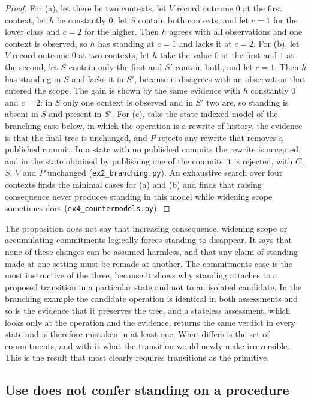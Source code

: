 \begin{proof}
For (a), let there be two contexts, let $V$ record outcome $0$ at the first context, let $h$ be constantly $0$, let $S$ contain both contexts, and let $c=1$ for the lower class and $c=2$ for the higher. Then $h$ agrees with all observations and one context is observed, so $h$ has standing at $c=1$ and lacks it at $c=2$. For (b), let $V$ record outcome $0$ at two contexts, let $h$ take the value $0$ at the first and $1$ at the second, let $S$ contain only the first and $S'$ contain both, and let $c=1$. Then $h$ has standing in $S$ and lacks it in $S'$, because it disagrees with an observation that entered the scope. The gain is shown by the same evidence with $h$ constantly $0$ and $c=2$: in $S$ only one context is observed and in $S'$ two are, so standing is absent in $S$ and present in $S'$. For (c), take the state-indexed model of the branching case below, in which the operation is a rewrite of history, the evidence is that the final tree is unchanged, and $P$ rejects any rewrite that removes a published commit. In a state with no published commits the rewrite is accepted, and in the state obtained by publishing one of the commits it is rejected, with $C$, $S$, $V$ and $P$ unchanged (\texttt{ex2\_branching.py}). An exhaustive search over four contexts finds the minimal cases for (a) and (b) and finds that raising consequence never produces standing in this model while widening scope sometimes does (\texttt{ex4\_countermodels.py}).
\end{proof}

The proposition does not say that increasing consequence, widening scope or accumulating commitments logically forces standing to disappear. It says that none of these changes can be assumed harmless, and that any claim of standing made at one setting must be remade at another. The commitments case is the most instructive of the three, because it shows why standing attaches to a proposed transition in a particular state and not to an isolated candidate. In the branching example the candidate operation is identical in both assessments and so is the evidence that it preserves the tree, and a stateless assessment, which looks only at the operation and the evidence, returns the same verdict in every state and is therefore mistaken in at least one. What differs is the set of commitments, and with it what the transition would newly make irreversible. This is the result that most clearly requires transitions as the primitive.

\subsection*{Use does not confer standing on a procedure}

